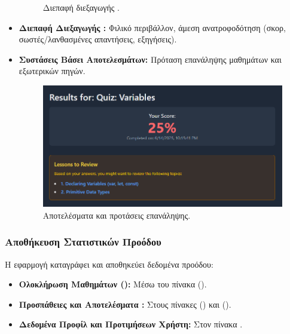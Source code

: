 \begin{itemize}[leftmargin=*, noitemsep]
\begin{figure}[h!]
          \caption{Διεπαφή διεξαγωγής .}
          \label{fig:quiz_interface_placeholder}
        \end{figure}
    \item \textbf{Διεπαφή Διεξαγωγής :} Φιλικό περιβάλλον, άμεση ανατροφοδότηση (σκορ, σωστές/λανθασμένες απαντήσεις, εξηγήσεις).
    \item \textbf{Συστάσεις Βάσει Αποτελεσμάτων:} Πρόταση επανάληψης μαθημάτων και εξωτερικών πηγών.
        \begin{figure}[h!]
          \centering
          \includegraphics[scale=0.4]{images/quiz_results_recommendations.png}
          \caption{Αποτελέσματα  και προτάσεις επανάληψης.}
          \label{fig:quiz_results_placeholder}
        \end{figure}
\end{itemize}

\subsubsection{Αποθήκευση Στατιστικών Προόδου}
\label{sec:statistika_proodou}
Η εφαρμογή καταγράφει και αποθηκεύει δεδομένα προόδου:
\begin{itemize}[leftmargin=*, noitemsep]
    \item \textbf{Ολοκλήρωση Μαθημάτων ():} Μέσω του πίνακα  ().
    \item \textbf{Προσπάθειες και Αποτελέσματα :} Στους πίνακες  () και  ().
    \item \textbf{Δεδομένα Προφίλ και Προτιμήσεων Χρήστη:} Στον πίνακα .
\end{itemize}

